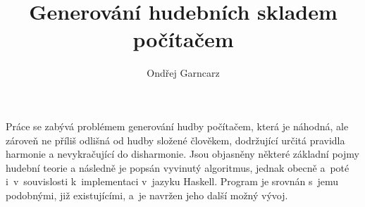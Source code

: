 \documentclass[a4paper, 12pt]{article}
\begin{document}
\author{Ondřej Garncarz}
\title{Generování hudebních skladem počítačem}
\date{}
\maketitle

Práce se zabývá problémem generování hudby počítačem, která je náhodná, ale zároveň ne příliš odlišná od hudby složené člověkem, dodržující určitá pravidla harmonie a nevykračující do disharmonie. Jsou objasněny některé základní pojmy hudební teorie a následně je popsán vyvinutý algoritmus, jednak obecně a~poté i~v~souvislosti k~implementaci v~jazyku Haskell. Program je srovnán s~jemu podobnými, již existujícími, a~je navržen jeho další možný vývoj.
\end{document}
